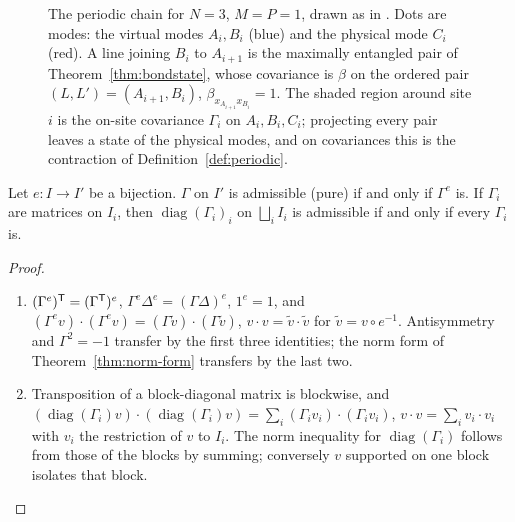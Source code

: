 \begin{figure}[t]
\centering
{}
\caption{The periodic chain for $N=3$, $M=P=1$, drawn as in \cite[Fig.~1]{ksvc}. Dots are
modes: the virtual modes $A_i,B_i$ (blue) and the physical mode $C_i$ (red). A line joining
$B_i$ to $A_{i+1}$ is the maximally entangled pair of Theorem~\ref{thm:bondstate}, whose
covariance is $\beta$ on the ordered pair $(L,L')=(A_{i+1},B_i)$, $\beta_{x_{A_{i+1}}x_{B_i}}=1$.
The shaded region around site $i$ is the on-site covariance $\Gamma_i$ on $A_i,B_i,C_i$;
projecting every pair leaves a state of the physical modes, and on covariances this is the
contraction of Definition~\ref{def:periodic}.}
\label{fig:ring}
\end{figure}

\begin{lemma}\label{lem:relabel}
Let $e:I\to I'$ be a bijection. $\Gamma$ on $I'$ is admissible (pure) if and only if
$\Gamma^e$ is. If $\Gamma_i$ are matrices on $I_i$, then $\operatorname{diag}(\Gamma_i)_i$ on
$\bigsqcup_iI_i$ is admissible if and only if every $\Gamma_i$ is.
\end{lemma}
\begin{proof}
\begin{enumerate}
\item[(a)] $(\Gamma^e)^{\mathsf T}=(\Gamma^{\mathsf T})^e$, $\Gamma^e\Delta^e=(\Gamma\Delta)^e$,
$1^e=1$, and $(\Gamma^ev)\cdot(\Gamma^ev)=(\Gamma\tilde v)\cdot(\Gamma\tilde v)$,
$v\cdot v=\tilde v\cdot\tilde v$ for $\tilde v=v\circ e^{-1}$. Antisymmetry and
$\Gamma^2=-1$ transfer by the first three identities; the norm form of
Theorem~\ref{thm:norm-form} transfers by the last two.
\item[(b)] Transposition of a block-diagonal matrix is blockwise, and
$(\operatorname{diag}(\Gamma_i)v)\cdot(\operatorname{diag}(\Gamma_i)v)=\sum_i(\Gamma_iv_i)\cdot(\Gamma_iv_i)$,
$v\cdot v=\sum_iv_i\cdot v_i$ with $v_i$ the restriction of $v$ to $I_i$. The norm
inequality for $\operatorname{diag}(\Gamma_i)$ follows from those of the blocks by
summing; conversely $v$ supported on one block isolates that block.
\end{enumerate}
\end{proof}

